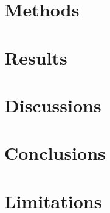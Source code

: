 \documentclass{article}
\begin{document}
\section{Methods}



\section{Results}


\section{Discussions}


\section{Conclusions}



\section{Limitations}
\end{document}

